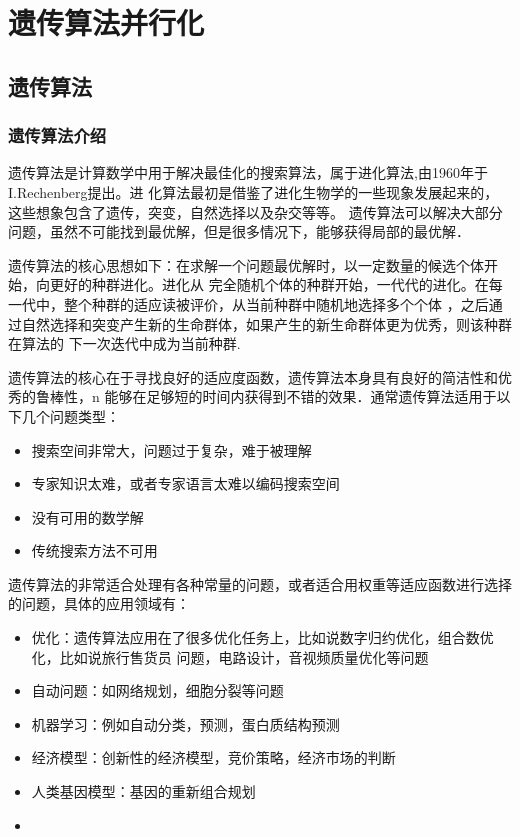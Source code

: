 
\chapter[遗传算法并行化]{遗传算法并行化}
\section{遗传算法}
\subsection{遗传算法介绍}
    遗传算法是计算数学中用于解决最佳化的搜索算法，属于进化算法,由1960年于I.Rechenberg提出。进
化算法最初是借鉴了进化生物学的一些现象发展起来的，这些想象包含了遗传，突变，自然选择以及杂交等等。
遗传算法可以解决大部分问题，虽然不可能找到最优解，但是很多情况下，能够获得局部的最优解．
    
    遗传算法的核心思想如下：在求解一个问题最优解时，以一定数量的候选个体开始，向更好的种群进化。进化从
完全随机个体的种群开始，一代代的进化。在每一代中，整个种群的适应读被评价，从当前种群中随机地选择多个个体
，之后通过自然选择和突变产生新的生命群体，如果产生的新生命群体更为优秀，则该种群在算法的
下一次迭代中成为当前种群.

    遗传算法的核心在于寻找良好的适应度函数，遗传算法本身具有良好的简洁性和优秀的鲁棒性，n
能够在足够短的时间内获得到不错的效果．通常遗传算法适用于以下几个问题类型：

    \begin{itemize}
    \item 搜索空间非常大，问题过于复杂，难于被理解
    \item 专家知识太难，或者专家语言太难以编码搜索空间
    \item 没有可用的数学解
    \item 传统搜索方法不可用
    \end{itemize}

    遗传算法的非常适合处理有各种常量的问题，或者适合用权重等适应函数进行选择的问题，具体的应用领域有：

    \begin{itemize}
    \item 优化：遗传算法应用在了很多优化任务上，比如说数字归约优化，组合数优化，比如说旅行售货员
问题，电路设计，音视频质量优化等问题
    \item 自动问题：如网络规划，细胞分裂等问题
    \item 机器学习：例如自动分类，预测，蛋白质结构预测
    \item 经济模型：创新性的经济模型，竞价策略，经济市场的判断
    \item 人类基因模型：基因的重新组合规划
    \item 
    \end{itemize}

